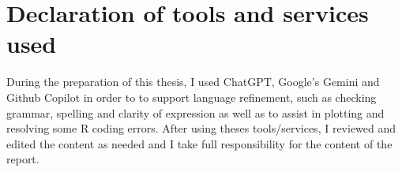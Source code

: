 \clearpage

\section{Declaration of tools and services used} \label{sec:declaration_tools_services}

During the preparation of this thesis, I used ChatGPT, Google's Gemini and Github Copilot in order to to support language refinement, such as checking grammar, spelling and clarity of expression as well as to assist in plotting and resolving some R coding errors. After using theses tools/services, I reviewed and edited the content as needed and I take full responsibility for the content of the report.

